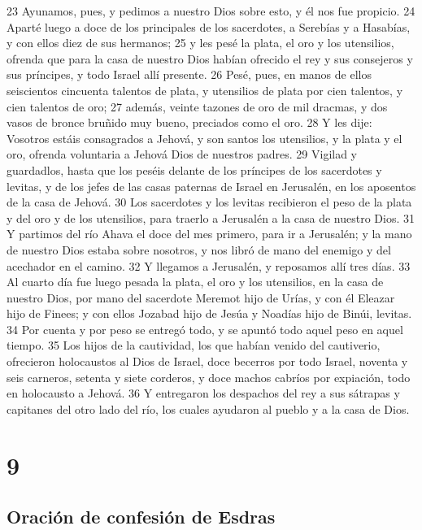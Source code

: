 23 Ayunamos, pues, y pedimos a nuestro Dios sobre esto, y él nos fue propicio.
24 Aparté luego a doce de los principales de los sacerdotes, a Serebías y a Hasabías, y con ellos diez de sus hermanos;
25 y les pesé la plata, el oro y los utensilios, ofrenda que para la casa de nuestro Dios habían ofrecido el rey y sus consejeros y sus príncipes, y todo Israel allí presente. 
26 Pesé, pues, en manos de ellos seiscientos cincuenta talentos de plata,  y utensilios de plata por cien talentos, y cien talentos de oro;
27 además, veinte tazones de oro de mil dracmas, y dos vasos de bronce bruñido muy bueno, preciados como el oro.
28 Y les dije: Vosotros estáis consagrados a Jehová, y son santos los utensilios, y la plata y el oro, ofrenda voluntaria a Jehová Dios de nuestros padres.
29 Vigilad y guardadlos, hasta que los peséis delante de los príncipes de los sacerdotes y levitas, y de los jefes de las casas paternas de Israel en Jerusalén, en los aposentos de la casa de Jehová.
30 Los sacerdotes y los levitas recibieron el peso de la plata y del oro y de los utensilios, para traerlo a Jerusalén a la casa de nuestro Dios.
31 Y partimos del río Ahava el doce del mes primero, para ir a Jerusalén; y la mano de nuestro Dios estaba sobre nosotros, y nos libró de mano del enemigo y del acechador en el camino.
32 Y llegamos a Jerusalén, y reposamos allí tres días.
33 Al cuarto día fue luego pesada la plata, el oro y los utensilios, en la casa de nuestro Dios, por mano del sacerdote Meremot hijo de Urías, y con él Eleazar hijo de Finees; y con ellos Jozabad hijo de Jesúa y Noadías hijo de Binúi, levitas.
34 Por cuenta y por peso se entregó todo, y se apuntó todo aquel peso en aquel tiempo.
35 Los hijos de la cautividad, los que habían venido del cautiverio, ofrecieron holocaustos al Dios de Israel, doce becerros por todo Israel, noventa y seis carneros, setenta y siete corderos, y doce machos cabríos por expiación, todo en holocausto a Jehová.
36 Y entregaron los despachos del rey a sus sátrapas y capitanes del otro lado del río, los cuales ayudaron al pueblo y a la casa de Dios.

\chapter{9}

\section*{Oración de confesión de Esdras}

